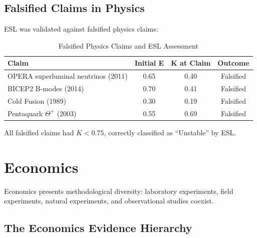 \documentclass[11pt,a4paper]{article}
\theoremstyle{remark}
\begin{document}
\subsection{Falsified Claims in Physics}

ESL was validated against falsified physics claims:

\begin{table}[h]
\centering
\caption{Falsified Physics Claims and ESL Assessment}
\label{tab:physics-falsified}
\begin{tabular}{lccc}
\toprule
\textbf{Claim} & \textbf{Initial E} & \textbf{K at Claim} & \textbf{Outcome} \\
\midrule
OPERA superluminal neutrinos (2011) & 0.65 & 0.40 & Falsified \\
BICEP2 B-modes (2014) & 0.70 & 0.41 & Falsified \\
Cold Fusion (1989) & 0.30 & 0.19 & Falsified \\
Pentaquark $\Theta^+$ (2003) & 0.55 & 0.69 & Falsified \\
\bottomrule
\end{tabular}
\end{table}

All falsified claims had $K < 0.75$, correctly classified as ``Unstable'' by ESL.


\section{Economics}
\label{sec:economics}

Economics presents methodological diversity: laboratory experiments, field experiments, natural experiments, and observational studies coexist.

\subsection{The Economics Evidence Hierarchy}
\end{document}
